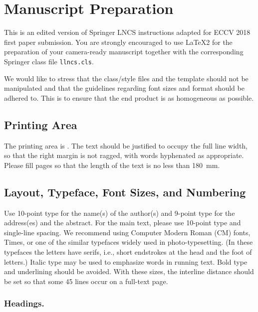 \documentclass[runningheads]{llncs}
\begin{document}
\section{Manuscript Preparation}

This is an edited version of Springer LNCS instructions adapted
for ECCV 2018 first paper submission.
You are strongly encouraged to use \LaTeX2 for the
preparation of your
camera-ready manuscript together with the corresponding Springer
class file \verb+llncs.cls+.

We would like to stress that the class/style files and the template
should not be manipulated and that the guidelines regarding font sizes
and format should be adhered to. This is to ensure that the end product
is as homogeneous as possible.

\subsection{Printing Area}
The printing area is .
The text should be justified to occupy the full line width,
so that the right margin is not ragged, with words hyphenated as
appropriate. Please fill pages so that the length of the text
is no less than 180~mm.

\subsection{Layout, Typeface, Font Sizes, and Numbering}
Use 10-point type for the name(s) of the author(s) and 9-point type for
the address(es) and the abstract. For the main text, please use 10-point
type and single-line spacing.
We recommend using Computer Modern Roman (CM) fonts, Times, or one
of the similar typefaces widely used in photo-typesetting.
(In these typefaces the letters have serifs, i.e., short endstrokes at
the head and the foot of letters.)
Italic type may be used to emphasize words in running text. Bold
type and underlining should be avoided.
With these sizes, the interline distance should be set so that some 45
lines occur on a full-text page.

\subsubsection{Headings.}
\end{document}
